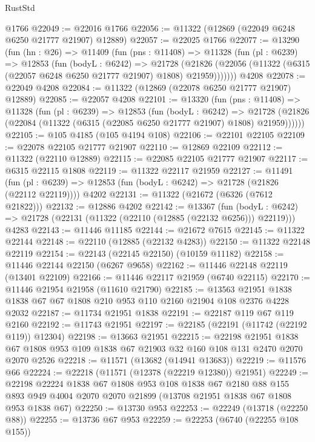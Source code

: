 \begin{lexlean}{RustStd}
\begin{coremodule}
    @1766
@22049 := @22016 @1766
@22056 := @11322 (@12869 (@22049 @6248 @6250 @21777 @21907) @12889)
@22057 := @22025 @1766
@22077 := @13290
    (fun (hn : @26) =>
    @11409
      (fun (pns : @11408) =>
      @11328
        (fun (pl : @6239) =>
        @12853
          (fun (bodyL : @6242) =>
          @21728
            (@21826 (@22056 (@11322 (@6315 (@22057 @6248 @6250 @21777 @21907) @1808) @21959)))))))
    @4208
@22078 := @22049 @4208
@22084 := @11322 (@12869 (@22078 @6250 @21777 @21907) @12889)
@22085 := @22057 @4208
@22101 := @13320
    (fun (pns : @11408) =>
    @11328
      (fun (pl : @6239) =>
      @12853
        (fun (bodyL : @6242) =>
        @21728 (@21826 (@22084 (@11322 (@6315 (@22085 @6250 @21777 @21907) @1808) @21959))))))
@22105 := @105 @4185 (@105 @4194 @108)
@22106 := @22101 @22105
@22109 := @22078 @22105 @21777 @21907
@22110 := @12869 @22109
@22112 := @11322 (@22110 @12889)
@22115 := @22085 @22105 @21777 @21907
@22117 := @6315 @22115 @1808
@22119 := @11322 @22117 @21959
@22127 := @11491
    (fun (pl : @6239) => @12853 (fun (bodyL : @6242) => @21728 (@21826 (@22112 @22119))))
    @4202
@22131 := @11322 (@21672 (@6326 (@7612 @21822)))
@22132 := @12886 @4202
@22142 := @13367
    (fun (bodyL : @6242) => @21728 (@22131 (@11322 (@22110 (@12885 (@22132 @6256))) @22119)))
    @4283
@22143 := @11446 @11185
@22144 := @21672 @7615
@22145 := @11322 @22144
@22148 := @22110 (@12885 (@22132 @4283))
@22150 := @11322 @22148 @22119
@22154 := @22143 (@22145 @22150) (@10159 @11182)
@22158 := @11446 @22144 @22150 (@6267 @9658)
@22162 := @11446 @22148 @22119 (@13401 @22109)
@22166 := @11446 @22117 @21959 (@6740 @22115)
@22170 := @11446 @21954 @21958 (@11610 @21790)
@22185 := @13563 @21951 @1838 @1838 @67 @67 @1808 @210 @953 @110 @2160 @21904 @108 @2376 @4228 @2032
@22187 := @11734 @21951 @1838
@22191 := @22187 @119 @67 @119 @2160
@22192 := @11743 @21951
@22197 := @22185 (@22191 (@11742 (@22192 @119)) @12304)
@22198 := @13663 @21951
@22215 := @22198
    @21951
    @1838
    @67
    @1808
    @953
    @109
    @1838
    @67
    @21903
    @32
    @160
    @108
    @131
    @2470
    @2070
    @2070
    @2526
@22218 := @11571 (@13682 (@14941 @13683))
@22219 := @11576 @66
@22224 := @22218 (@11571 (@12378 (@22219 @12380)) @21951)
@22249 := @22198
    @22224
    @1838
    @67
    @1808
    @953
    @108
    @1838
    @67
    @2180
    @88
    @155
    @893
    @949
    @4004
    @2070
    @2070
    @21899
    (@13708 @21951 @1838 @67 @1808 @953 @1838 @67)
@22250 := @13730 @953
@22253 := @22249 (@13718 (@22250 @88))
@22255 := @13736 @67 @953
@22259 := @22253 (@6740 (@22255 @108 @155))

\end{coremodule}
\end{lexlean}
